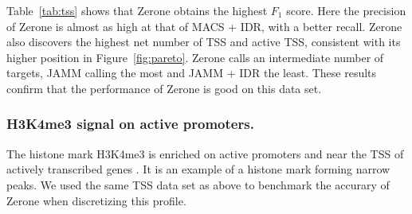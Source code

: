 \documentclass{bioinfo}
\begin{document}
Table~\ref{tab:tss} shows that Zerone obtains the highest $F_1$
score. Here the precision of Zerone is almost as high at that of MACS
+ IDR, with a better recall. Zerone also discovers the highest net
number of TSS and active TSS, consistent with its higher position
in Figure~\ref{fig:pareto}. Zerone calls an intermediate number of
targets, JAMM calling the most and JAMM + IDR the least.
These results confirm that the performance
of Zerone is good on this data set.

\subsubsection{H3K4me3 signal on active promoters.}
\label{subsub:h3k4me3}
The histone mark H3K4me3 is enriched on active promoters and
near the TSS of actively transcribed genes
\citep{pmid15680324,pmid17512414,pmid17277777}. It is an example
of a histone mark forming narrow peaks. We used the same TSS data set
as above to benchmark the accurary of Zerone when discretizing
this profile.
\end{document}
